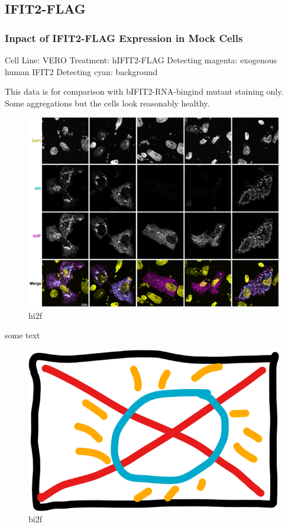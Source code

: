 \subsection{IFIT2-FLAG}
\subsubsection{Inpact of IFIT2-FLAG Expression in Mock Cells} \label{Inpact of IFIT2-FLAG Expression in Mock Cells}
Cell Line: VERO \newline
Treatment: hIFIT2-FLAG \newline
Detecting magenta: exogenous human IFIT2 \newline
Detecting cyan: background \newline

This data is for comparison with bIFIT2-RNA-bingind mutant staining only. Some aggregations but the cells look reasonably healthy.

\begin{figure}
    \centering
    \includegraphics[width=1\linewidth]{09. Chapter 4//Figs//03. IFIT2-FLAG/01. hi2f mock.png}
    \caption[hi2f]{hi2f}
    \label{hi2f}
\end{figure}

some text

\begin{figure}
    \centering
    \includegraphics[width=0.5\linewidth]{09. Chapter 4//Figs//03. IFIT2-FLAG/00. placeholder.png}
    \caption[bi2f]{bi2f}
    \label{bi2f}
\end{figure}

